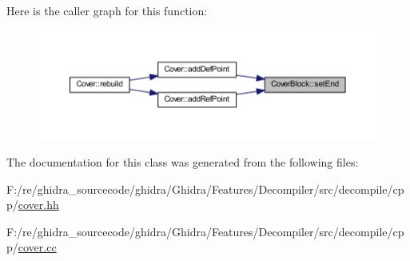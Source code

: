 Here is the caller graph for this function\+:
\nopagebreak
\begin{figure}[H]
\begin{center}
\leavevmode
\includegraphics[width=350pt]{class_cover_block_aa6171bf30cc73dcf75bafdbe71b83a5d_icgraph}
\end{center}
\end{figure}


The documentation for this class was generated from the following files\+:\begin{DoxyCompactItemize}
\item 
F\+:/re/ghidra\+\_\+sourcecode/ghidra/\+Ghidra/\+Features/\+Decompiler/src/decompile/cpp/\mbox{\hyperlink{cover_8hh}{cover.\+hh}}\item 
F\+:/re/ghidra\+\_\+sourcecode/ghidra/\+Ghidra/\+Features/\+Decompiler/src/decompile/cpp/\mbox{\hyperlink{cover_8cc}{cover.\+cc}}\end{DoxyCompactItemize}
